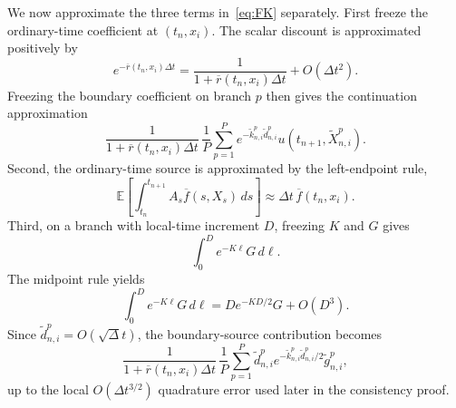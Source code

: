 \documentclass[10pt,a4paper]{amsart}
\newcommand{\E}{\mathbb{E}}
\newcommand{\dt}{\Delta t}
\begin{document}
	We now approximate the three terms in~\eqref{eq:FK} separately.  First freeze the ordinary-time coefficient at $(t_n,x_i)$.  The scalar discount is approximated positively by
	\begin{equation}
		e^{-\overline r(t_n,x_i)\dt}
		=\frac{1}{1+\overline r(t_n,x_i)\dt}+O(\dt^2).
		\label{eq:ordinary-discount}
	\end{equation}
	Freezing the boundary coefficient on branch $p$ then gives the continuation approximation
	\begin{equation}
		\frac{1}{1+\overline r(t_n,x_i)\dt}\,
		\frac1P\sum_{p=1}^P
		e^{-\widetilde k_{n,i}^p\widetilde d_{n,i}^p}
		u(t_{n+1},\widetilde X_{n,i}^p).
		\label{eq:linear-continuation}
	\end{equation}
	Second, the ordinary-time source is approximated by the left-endpoint rule,
	\begin{equation}
		\E\!\left[\int_{t_n}^{t_{n+1}}A_s\overline f(s,X_s)\,ds\right]
		\approx\dt\,\overline f(t_n,x_i).
		\label{eq:linear-volume-source}
	\end{equation}
	Third, on a branch with local-time increment $D$, freezing $K$ and $G$ gives
	\[
	\int_0^D e^{-K\ell}G\,d\ell.
	\]
	The midpoint rule yields
	\begin{equation}
		\int_0^D e^{-K\ell}G\,d\ell
		=D e^{-KD/2}G+O(D^3).
		\label{eq:midpoint-local-time}
	\end{equation}
	Since $\widetilde d_{n,i}^p=O(\sqrt\dt)$, the boundary-source contribution becomes
	\begin{equation}
		\frac{1}{1+\overline r(t_n,x_i)\dt}\,
		\frac1P\sum_{p=1}^P
		\widetilde d_{n,i}^p e^{-\widetilde k_{n,i}^p\widetilde d_{n,i}^p/2}
		\widetilde g_{n,i}^p,
		\label{eq:linear-boundary-source}
	\end{equation}
	up to the local $O(\dt^{3/2})$ quadrature error used later in the consistency proof.
	
\end{document}
